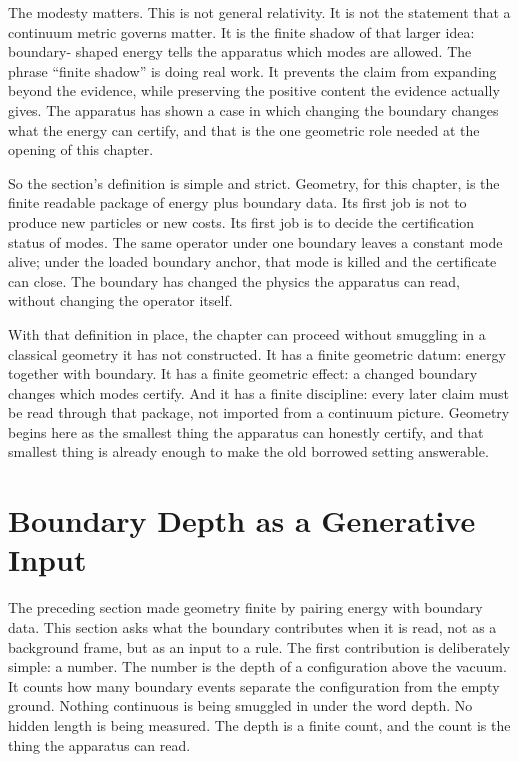 The modesty matters. This is not general relativity. It is not the statement that a
continuum metric governs matter. It is the finite shadow of that larger idea: boundary-
shaped energy tells the apparatus which modes are allowed. The phrase ``finite
shadow'' is doing real work. It prevents the claim from expanding beyond the evidence,
while preserving the positive content the evidence actually gives. The apparatus has
shown a case in which changing the boundary changes what the energy can certify, and
that is the one geometric role needed at the opening of this chapter.

So the section's definition is simple and strict. Geometry, for this chapter, is the
finite readable package of energy plus boundary data. Its first job is not to produce
new particles or new costs. Its first job is to decide the certification status of
modes. The same operator under one boundary leaves a constant mode alive; under the
loaded boundary anchor, that mode is killed and the certificate can close. The
boundary has changed the physics the apparatus can read, without changing the
operator itself.

With that definition in place, the chapter can proceed without smuggling in a
classical geometry it has not constructed. It has a finite geometric datum: energy
together with boundary. It has a finite geometric effect: a changed boundary changes
which modes certify. And it has a finite discipline: every later claim must be read
through that package, not imported from a continuum picture. Geometry begins here as
the smallest thing the apparatus can honestly certify, and that smallest thing is
already enough to make the old borrowed setting answerable.

\section{Boundary Depth as a Generative Input}

The preceding section made geometry finite by pairing energy with boundary data. This
section asks what the boundary contributes when it is read, not as a background frame,
but as an input to a rule. The first contribution is deliberately simple: a number.
The number is the depth of a configuration above the vacuum. It counts how many
boundary events separate the configuration from the empty ground. Nothing continuous
is being smuggled in under the word depth. No hidden length is being measured. The
depth is a finite count, and the count is the thing the apparatus can read.

